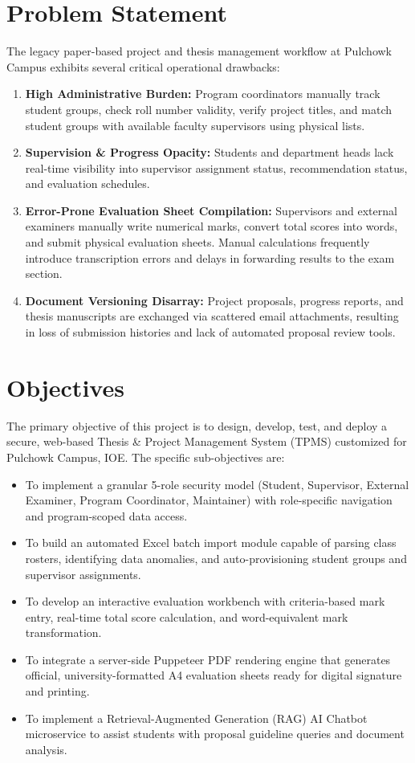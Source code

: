 \documentclass[12pt]{report}
\begin{document}
\section{Problem Statement}
The legacy paper-based project and thesis management workflow at Pulchowk Campus exhibits several critical operational drawbacks:
\begin{enumerate}
    \item \textbf{High Administrative Burden:} Program coordinators manually track student groups, check roll number validity, verify project titles, and match student groups with available faculty supervisors using physical lists.
    \item \textbf{Supervision \& Progress Opacity:} Students and department heads lack real-time visibility into supervisor assignment status, recommendation status, and evaluation schedules.
    \item \textbf{Error-Prone Evaluation Sheet Compilation:} Supervisors and external examiners manually write numerical marks, convert total scores into words, and submit physical evaluation sheets. Manual calculations frequently introduce transcription errors and delays in forwarding results to the exam section.
    \item \textbf{Document Versioning Disarray:} Project proposals, progress reports, and thesis manuscripts are exchanged via scattered email attachments, resulting in loss of submission histories and lack of automated proposal review tools.
\end{enumerate}

\section{Objectives}
The primary objective of this project is to design, develop, test, and deploy a secure, web-based Thesis \& Project Management System (TPMS) customized for Pulchowk Campus, IOE. The specific sub-objectives are:
\begin{itemize}
    \item To implement a granular 5-role security model (Student, Supervisor, External Examiner, Program Coordinator, Maintainer) with role-specific navigation and program-scoped data access.
    \item To build an automated Excel batch import module capable of parsing class rosters, identifying data anomalies, and auto-provisioning student groups and supervisor assignments.
    \item To develop an interactive evaluation workbench with criteria-based mark entry, real-time total score calculation, and word-equivalent mark transformation.
    \item To integrate a server-side Puppeteer PDF rendering engine that generates official, university-formatted A4 evaluation sheets ready for digital signature and printing.
    \item To implement a Retrieval-Augmented Generation (RAG) AI Chatbot microservice to assist students with proposal guideline queries and document analysis.
\end{itemize}
\end{document}
